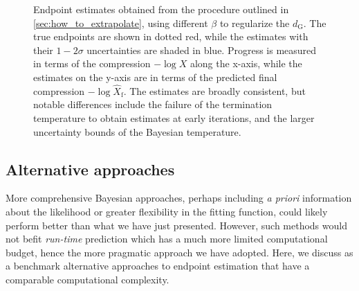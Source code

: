 \documentclass[usenatbib]{mnras}
\newcommand{\dG}{d_\mathrm{G}}
\begin{document}
\begin{figure*}
\newline
{}
\newline
{}
\caption{Endpoint estimates obtained from the procedure outlined in \cref{sec:how_to_extrapolate}, using different $\beta$ to regularize the $\dG$. The true endpoints are shown in dotted red, while the estimates with their $1-2\sigma$ uncertainties are shaded in blue. Progress is measured in terms of the compression $-\log X$ along the x-axis, while the estimates on the y-axis are in terms of the predicted final compression $-\log \hat{X}_\mathrm{f}$. The estimates are broadly consistent, but notable differences include the failure of the termination temperature to obtain estimates at early iterations, and the larger uncertainty bounds of the Bayesian temperature.}
\label{fig:beta_endpoint_comparison}
\end{figure*}



\subsection{Alternative approaches}
More comprehensive Bayesian approaches, perhaps including \textit{a priori} information about the likelihood or greater flexibility in the fitting function, could likely perform better than what we have just presented. However, such methods would not befit \textit{run-time} prediction which has a much more limited computational budget, hence the more pragmatic approach we have adopted. Here, we discuss as a benchmark alternative approaches to endpoint estimation that have a comparable computational complexity.
\end{document}
